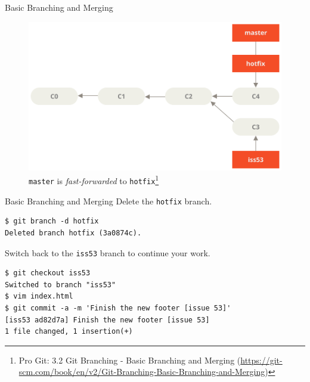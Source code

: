 \documentclass[aspectratio=169]{beamer}
\renewcommand{\footnotesize}{\tiny}
\newcommand{\sectiontitle}{}
\begin{document}
\begin{frame}[fragile]{Basic Branching and Merging}{\sectiontitle}
\begin{figure}
    \centering
    \includegraphics[width=\textwidth,height=0.5\textheight,keepaspectratio]{basic-branching-5}
    \caption{
        \texttt{master} is \emph{fast-forwarded} to \texttt{hotfix}\footnote{
            Pro Git: 3.2 Git Branching - Basic Branching and Merging
            (\url{https://git-scm.com/book/en/v2/Git-Branching-Basic-Branching-and-Merging})
        }
    }
\end{figure}
\end{frame}

\begin{frame}[fragile]{Basic Branching and Merging}{\sectiontitle}
Delete the \verb|hotfix| branch.
\begin{verbatim}
$ git branch -d hotfix
Deleted branch hotfix (3a0874c).
\end{verbatim}
Switch back to the \verb|iss53| branch to continue your work.
\begin{verbatim}
$ git checkout iss53
Switched to branch "iss53"
$ vim index.html
$ git commit -a -m 'Finish the new footer [issue 53]'
[iss53 ad82d7a] Finish the new footer [issue 53]
1 file changed, 1 insertion(+)
\end{verbatim}
\end{frame}
\end{document}
